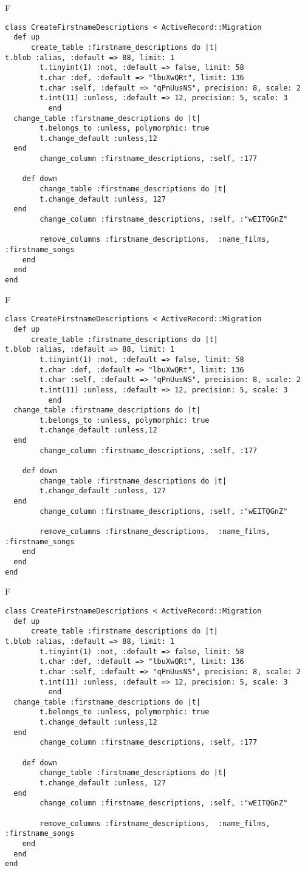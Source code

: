 F
\begin{verbatim}
class CreateFirstnameDescriptions < ActiveRecord::Migration
  def up
	  create_table :firstname_descriptions do |t|
t.blob :alias, :default => 88, limit: 1
		t.tinyint(1) :not, :default => false, limit: 58
		t.char :def, :default => "lbuXwQRt", limit: 136
		t.char :self, :default => "qPnUusNS", precision: 8, scale: 2
		t.int(11) :unless, :default => 12, precision: 5, scale: 3
		  end
  change_table :firstname_descriptions do |t|
		t.belongs_to :unless, polymorphic: true
 		t.change_default :unless,12
  end
 		change_column :firstname_descriptions, :self, :177
   
	def down
		change_table :firstname_descriptions do |t|
		t.change_default :unless, 127
  end
 		change_column :firstname_descriptions, :self, :"wEITQGnZ"
   
		remove_columns :firstname_descriptions,  :name_films, :firstname_songs 
    end 
  end
end

\end{verbatim}

F
\begin{verbatim}
class CreateFirstnameDescriptions < ActiveRecord::Migration
  def up
	  create_table :firstname_descriptions do |t|
t.blob :alias, :default => 88, limit: 1
		t.tinyint(1) :not, :default => false, limit: 58
		t.char :def, :default => "lbuXwQRt", limit: 136
		t.char :self, :default => "qPnUusNS", precision: 8, scale: 2
		t.int(11) :unless, :default => 12, precision: 5, scale: 3
		  end
  change_table :firstname_descriptions do |t|
		t.belongs_to :unless, polymorphic: true
 		t.change_default :unless,12
  end
 		change_column :firstname_descriptions, :self, :177
   
	def down
		change_table :firstname_descriptions do |t|
		t.change_default :unless, 127
  end
 		change_column :firstname_descriptions, :self, :"wEITQGnZ"
   
		remove_columns :firstname_descriptions,  :name_films, :firstname_songs 
    end 
  end
end

\end{verbatim}

F
\begin{verbatim}
class CreateFirstnameDescriptions < ActiveRecord::Migration
  def up
	  create_table :firstname_descriptions do |t|
t.blob :alias, :default => 88, limit: 1
		t.tinyint(1) :not, :default => false, limit: 58
		t.char :def, :default => "lbuXwQRt", limit: 136
		t.char :self, :default => "qPnUusNS", precision: 8, scale: 2
		t.int(11) :unless, :default => 12, precision: 5, scale: 3
		  end
  change_table :firstname_descriptions do |t|
		t.belongs_to :unless, polymorphic: true
 		t.change_default :unless,12
  end
 		change_column :firstname_descriptions, :self, :177
   
	def down
		change_table :firstname_descriptions do |t|
		t.change_default :unless, 127
  end
 		change_column :firstname_descriptions, :self, :"wEITQGnZ"
   
		remove_columns :firstname_descriptions,  :name_films, :firstname_songs 
    end 
  end
end

\end{verbatim}

